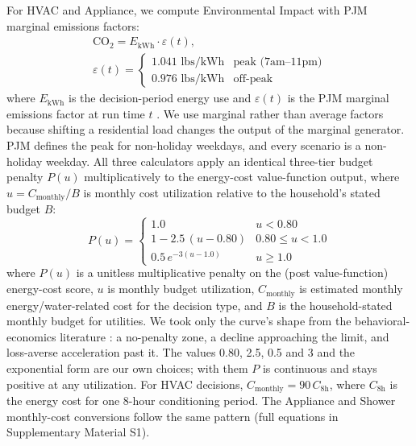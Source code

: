 \documentclass[final,3p,times]{elsarticle}
\begin{document}
For HVAC and Appliance, we compute Environmental Impact with PJM marginal emissions factors:
\begin{equation}
\begin{gathered}
  \mathrm{CO_2} = E_{\mathrm{kWh}} \cdot \varepsilon(t), \\[4pt]
  \varepsilon(t) = \begin{cases}
    1.041 \text{ lbs/kWh} & \text{peak (7am--11pm)} \\
    0.976 \text{ lbs/kWh} & \text{off-peak}
  \end{cases}
\end{gathered}
  \label{eq:emissions}
\end{equation}
\noindent where $E_{\mathrm{kWh}}$ is the decision-period energy use and $\varepsilon(t)$ is the PJM marginal emissions factor at run time $t$ \cite{pjm2022emissions}. We use marginal rather than average factors because shifting a residential load changes the output of the marginal generator. PJM defines the peak for non-holiday weekdays, and every scenario is a non-holiday weekday.
All three calculators apply an identical three-tier budget penalty $P(u)$ multiplicatively to the energy-cost value-function output, where $u = C_{\mathrm{monthly}} / B$ is monthly cost utilization relative to the household's stated budget $B$:
\begin{equation}
  P(u) = \begin{cases}
    1.0                          & u < 0.80                   \\[4pt]
    1 - 2.5\,(u - 0.80)         & 0.80 \le u < 1.0           \\[4pt]
    0.5\,e^{-3(u - 1.0)}        & u \ge 1.0
  \end{cases}
  \label{eq:budget_penalty}
\end{equation}
\noindent where $P(u)$ is a unitless multiplicative penalty on the (post value-function) energy-cost score, $u$ is monthly budget utilization, $C_{\mathrm{monthly}}$ is estimated monthly energy/water-related cost for the decision type, and $B$ is the household-stated monthly budget for utilities.
\noindent We took only the curve's shape from the behavioral-economics literature \cite{thaler1999,heath1996,prelec1998,gathergood2012}: a no-penalty zone, a decline approaching the limit, and loss-averse acceleration past it. The values 0.80, 2.5, 0.5 and 3 and the exponential form are our own choices; with them $P$ is continuous and stays positive at any utilization. For HVAC decisions, $C_{\mathrm{monthly}} = 90\,C_{\mathrm{8h}}$, where $C_{\mathrm{8h}}$ is the energy cost for one 8-hour conditioning period. The Appliance and Shower monthly-cost conversions follow the same pattern (full equations in Supplementary Material S1).
\end{document}

